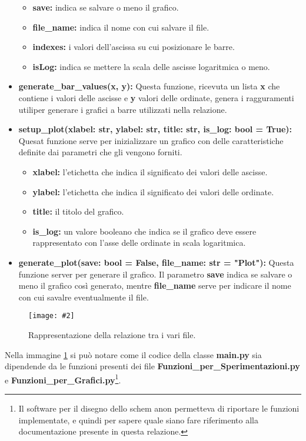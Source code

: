 \documentclass{article}
\newcommand{\image}[3][1]{
	\centering
	\texttt{[image: \#2]}
	\caption{#3}
}
\newcommand{\newlineitem}[1]{\item \textbf{#1} \hfill \break}
\begin{document}
\begin{itemize}
\begin{itemize}
\item \textbf{save:} indica se salvare o meno il grafico.
\item \textbf{file\_name:} indica il nome con cui salvare il file.
\item \textbf{indexes:} i valori dell'ascissa su cui posizionare le barre.
\item \textbf{isLog:} indica se mettere la scala delle ascisse logaritmica o meno.
\end{itemize}
\newlineitem{generate\_bar\_values(x, y):}
Questa funzione, ricevuta un lista \textbf{x} che contiene i valori delle ascisse e \textbf{y} valori delle ordinate, genera i ragguramenti utiliper generare i grafici a barre utilizzati nella relazione.
\newlineitem{setup\_plot(xlabel: str, ylabel: str, title: str, is\_log: bool = True):}
Quesat funzione serve per inizializzare un grafico con delle caratteristiche definite dai parametri che gli vengono forniti.
\begin{itemize}
\item \textbf{xlabel:} l'etichetta che indica il significato dei valori delle ascisse.
\item \textbf{ylabel:} l'etichetta che indica il significato dei valori delle ordinate.
\item \textbf{title:} il titolo del grafico.
\item \textbf{is\_log:} un valore booleano che indica se il grafico deve essere rappresentato con l'asse delle ordinate in scala logaritmica.
\end{itemize}

\newlineitem{generate\_plot(save: bool = False, file\_name: str = "Plot"):}
Questa funzione server per generare il grafico. Il parametro \textbf{save} indica se salvare o meno il grafico così generato, mentre \textbf{file\_name} serve per indicare il nome con cui savalre eventualmente il file.
\end{itemize}

\begin{figure}[H]
\image[0.75]{File_UML}{Rappresentazione della relazione tra i vari file.}
\label{fig:File_UML}
\end{figure}

Nella immagine \ref{fig:File_UML} si può notare come il codice della classe \textbf{main.py} sia dipendende da le funzioni presenti dei file \textbf{Funzioni\_per\_Sperimentazioni.py} e \textbf{Funzioni\_per\_Grafici.py}\footnote{Il software per il disegno dello schem anon permetteva di riportare le funzioni implementate, e quindi per sapere quale siano fare riferimento alla documentazione presente in questa relazione.}.
\end{document}
